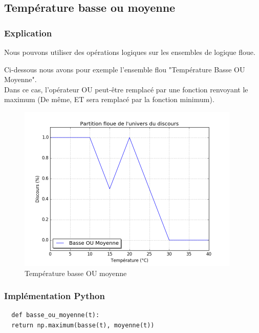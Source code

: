 \documentclass[a4paper]{article}
\begin{document}
\subsection{Température basse ou moyenne}

\subsubsection{Explication}
Nous pouvons utiliser des opérations logiques sur les ensembles de logique floue.

Ci-dessous nous avons pour exemple l'ensemble flou "Température Basse OU Moyenne".\\
Dans ce cas, l'opérateur OU peut-être remplacé par une fonction renvoyant le maximum (De même, ET sera remplacé par la fonction minimum).

\begin{figure}[h]
\begin{center}
	\includegraphics[width=400px]{plot_basse_ou_moyenne.png}
\end{center}
\caption{Température basse OU moyenne}
\end{figure}

\subsubsection{Implémentation Python}

\begin{lstlisting}
  def basse_ou_moyenne(t):
  return np.maximum(basse(t), moyenne(t))
\end{lstlisting}


\clearpage
\end{document}
